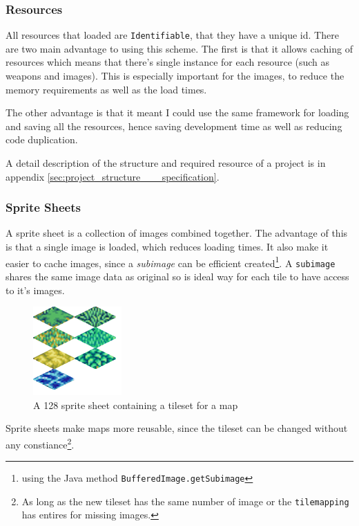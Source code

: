 
\subsubsection{Resources}

All resources that loaded are \texttt{Identifiable}, that they have a unique id.  There are two main advantage to using this scheme. The first is that it allows caching of resources which means that there's single instance for each resource (such as weapons and images). This is especially important for the images, to reduce the memory requirements as well as the load times.

The other advantage is that it meant I could use the same framework for loading and saving all the resources, hence saving development time as well as reducing code duplication. 

A detail description of the structure and  required resource of a project is in appendix \ref{sec:project_structure___specification}.

\subsubsection{Sprite Sheets}
\label{ssub:sprite_sheets}


A sprite sheet is a collection of images combined together. The advantage of this is that a single image is loaded, which reduces loading times. It also make it easier to cache images, since a \emph{subimage} can be efficient created\footnote{using the Java method \texttt{BufferedImage.getSubimage}}. A \texttt{subimage} shares the same image data as original so is ideal way for each tile to have access to it's images\cite{bufferedImage}.    

\begin{figure}[htbp]
	\centering
		\includegraphics{figures/tileset.png}
	\caption{A 128 sprite sheet containing a tileset for a map}
	\label{fig:figures_tileset}
\end{figure}

Sprite sheets make maps more reusable, since the tileset can be changed without any constiance\footnote{As long as the new tileset has the same number of image or the \texttt{tilemapping} has entires for missing images.}.  

